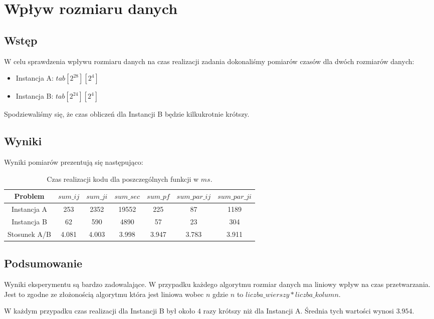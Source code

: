 \section{Wpływ rozmiaru danych}

\subsection{Wstęp}

W celu sprawdzenia wpływu rozmiaru danych na czas realizacji zadania dokonaliśmy pomiarów czasów dla dwóch rozmiarów danych:

\begin{itemize}
\item Instancja A: $tab[2^{28}][2^4]$
\item Instancja B: $tab[2^{24}][2^4]$
\end{itemize}

Spodziewaliśmy się, że czas obliczeń dla Instancji B będzie kilkukrotnie krótszy.

\subsection{Wyniki}

Wyniki pomiarów prezentują się następująco:

\begin{table}[!ht]
\caption{Czas realizacji kodu dla poszczególnych funkcji w $ms$.}
\begin{tabular}{|c|c|c|c|c|c|c|}

\hline
  Problem &
  $sum\_ij$ &
  $sum\_ji$ &
  $sum\_sec$ &
  $sum\_pf$ &
  $sum\_par\_ij$ &
  $sum\_par\_ji$ \\
\hline Instancja A &
  253 &
  2352 &
  19552 &
  225 &
  87 &
  1189 \\
\hline Instancja B &
  62 &
  590 &
  4890 &
  57 &
  23 &
  304 \\
\hline Stosunek A/B &
  4.081 &
  4.003 &
  3.998 &
  3.947 &
  3.783 &
  3.911 \\
\hline

\end{tabular}
\end{table}

\subsection{Podsumowanie}

Wyniki eksperymentu są bardzo zadowalające. W przypadku każdego algorytmu rozmiar danych ma liniowy wpływ na czas przetwarzania. Jest to zgodne ze złożonością algorytmu która jest liniowa wobec $n$ gdzie $n$ to $liczba\_wierszy * liczba\_kolumn$.\newline

W każdym przypadku czas realizacji dla Instancji B był około $4$ razy krótszy niż dla Instancji A. Średnia tych wartości wynosi $3.954$.
